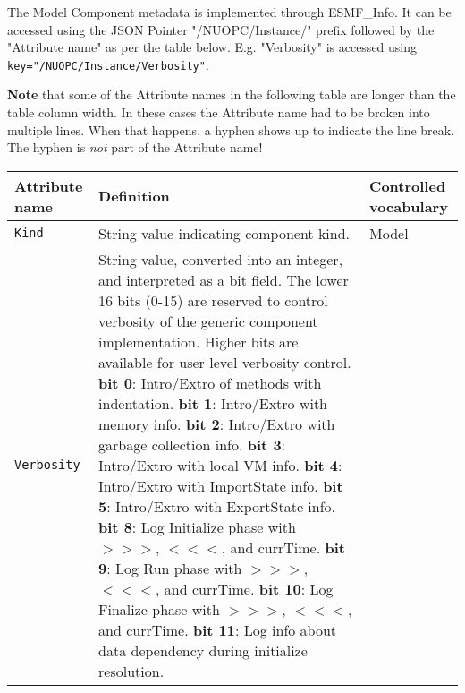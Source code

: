 \label{ModelCompMeta}
The Model Component metadata is implemented through ESMF\_Info. It can be accessed
using the JSON Pointer "/NUOPC/Instance/" prefix followed by the "Attribute name"
as per the table below. E.g. "Verbosity" is accessed using {\tt key="/NUOPC/Instance/Verbosity"}.

{\bf Note} that some of the Attribute names in the following table are longer than the table column width. In these cases the
Attribute name had to be broken into multiple lines. When that happens, a hyphen shows up to indicate the line break. The hyphen
is {\em not} part of the Attribute name!

\begin{longtable}{|p{}|p{}|p{}|}
     \hline\hline
     {\bf Attribute name} & {\bf Definition} & {\bf Controlled vocabulary}\\
     \hline\hline
     {\tt Kind} & String value indicating component kind.& Model\\ \hline
     {\tt Verbosity} & String value, converted into an integer, and interpreted as a bit field. The lower 16 bits (0-15) are reserved to control verbosity of the generic component implementation. Higher bits are available for user level verbosity control. \newline
                       {\bf bit 0}: Intro/Extro of methods with indentation.\newline
                       {\bf bit 1}: Intro/Extro with memory info.\newline
                       {\bf bit 2}: Intro/Extro with garbage collection info.\newline
                       {\bf bit 3}: Intro/Extro with local VM info.\newline
                       {\bf bit 4}: Intro/Extro with ImportState info.\newline
                       {\bf bit 5}: Intro/Extro with ExportState info.\newline
                       {\bf bit 8}: Log Initialize phase with $>>>$, $<<<$, and currTime.\newline
                       {\bf bit 9}: Log Run phase with $>>>$, $<<<$, and currTime.\newline
                       {\bf bit 10}: Log Finalize phase with $>>>$, $<<<$, and currTime.\newline
                       {\bf bit 11}: Log info about data dependency during initialize resolution.\newline

\end{longtable}
